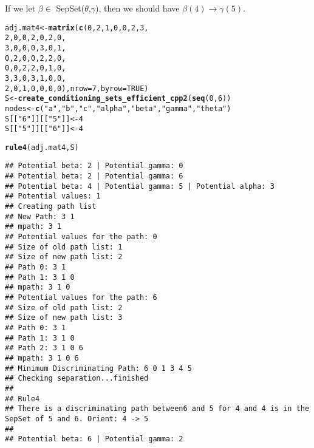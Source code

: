 \documentclass[12pt]{article}\usepackage[]{graphicx}\usepackage[]{color}
\makeatletter
\newcommand{\hlnum}[1]{\textcolor[rgb]{0.686,0.059,0.569}{#1}}%
\newcommand{\hlstr}[1]{\textcolor[rgb]{0.192,0.494,0.8}{#1}}%
\newcommand{\hlstd}[1]{\textcolor[rgb]{0.345,0.345,0.345}{#1}}%
\newcommand{\hlkwb}[1]{\textcolor[rgb]{0.69,0.353,0.396}{#1}}%
\newcommand{\hlkwc}[1]{\textcolor[rgb]{0.333,0.667,0.333}{#1}}%
\newcommand{\hlkwd}[1]{\textcolor[rgb]{0.737,0.353,0.396}{\textbf{#1}}}%
\newenvironment{kframe}{%
 \def\at@end@of@kframe{}%
 \ifinner\ifhmode%
  \def\at@end@of@kframe{\end{minipage}}%
  \begin{minipage}{\columnwidth}%
 \fi\fi%
 \def\FrameCommand##1{\hskip\@totalleftmargin \hskip-\fboxsep
 \colorbox{shadecolor}{##1}\hskip-\fboxsep
     \hskip-\linewidth \hskip-\@totalleftmargin \hskip\columnwidth}%
 \MakeFramed {\advance\hsize-\width
   \@totalleftmargin\z@ \linewidth\hsize
   \@setminipage}}%
 {\par\unskip\endMakeFramed%
 \at@end@of@kframe}
\newenvironment{knitrout}{}{} %
\makeatother
\begin{document}
If we let $\beta \in $ SepSet($\theta$,$\gamma$), then we should have $\beta (4) \rightarrow \gamma (5)$.
\begin{knitrout}
\color{fgcolor}\begin{kframe}
\begin{alltt}
\hlstd{adj.mat4} \hlkwb{<-} \hlkwd{matrix}\hlstd{(}\hlkwd{c}\hlstd{(}\hlnum{0}\hlstd{,}\hlnum{2}\hlstd{,}\hlnum{1}\hlstd{,}\hlnum{0}\hlstd{,}\hlnum{0}\hlstd{,}\hlnum{2}\hlstd{,}\hlnum{3}\hlstd{,}
                     \hlnum{2}\hlstd{,}\hlnum{0}\hlstd{,}\hlnum{0}\hlstd{,}\hlnum{2}\hlstd{,}\hlnum{0}\hlstd{,}\hlnum{2}\hlstd{,}\hlnum{0}\hlstd{,}
                     \hlnum{3}\hlstd{,}\hlnum{0}\hlstd{,}\hlnum{0}\hlstd{,}\hlnum{0}\hlstd{,}\hlnum{3}\hlstd{,}\hlnum{0}\hlstd{,}\hlnum{1}\hlstd{,}
                     \hlnum{0}\hlstd{,}\hlnum{2}\hlstd{,}\hlnum{0}\hlstd{,}\hlnum{0}\hlstd{,}\hlnum{2}\hlstd{,}\hlnum{2}\hlstd{,}\hlnum{0}\hlstd{,}
                     \hlnum{0}\hlstd{,}\hlnum{0}\hlstd{,}\hlnum{2}\hlstd{,}\hlnum{2}\hlstd{,}\hlnum{0}\hlstd{,}\hlnum{1}\hlstd{,}\hlnum{0}\hlstd{,}
                     \hlnum{3}\hlstd{,}\hlnum{3}\hlstd{,}\hlnum{0}\hlstd{,}\hlnum{3}\hlstd{,}\hlnum{1}\hlstd{,}\hlnum{0}\hlstd{,}\hlnum{0}\hlstd{,}
                     \hlnum{2}\hlstd{,}\hlnum{0}\hlstd{,}\hlnum{1}\hlstd{,}\hlnum{0}\hlstd{,}\hlnum{0}\hlstd{,}\hlnum{0}\hlstd{,}\hlnum{0}\hlstd{),}\hlkwc{nrow} \hlstd{=} \hlnum{7}\hlstd{,}\hlkwc{byrow} \hlstd{=} \hlnum{TRUE}\hlstd{)}
\hlstd{S} \hlkwb{<-} \hlkwd{create_conditioning_sets_efficient_cpp2}\hlstd{(}\hlkwd{seq}\hlstd{(}\hlnum{0}\hlstd{,}\hlnum{6}\hlstd{))}
\hlstd{nodes} \hlkwb{<-} \hlkwd{c}\hlstd{(}\hlstr{"a"}\hlstd{,}\hlstr{"b"}\hlstd{,}\hlstr{"c"}\hlstd{,}\hlstr{"alpha"}\hlstd{,}\hlstr{"beta"}\hlstd{,}\hlstr{"gamma"}\hlstd{,}\hlstr{"theta"}\hlstd{)}
\hlstd{S[[}\hlstr{"6"}\hlstd{]][[}\hlstr{"5"}\hlstd{]]} \hlkwb{<-} \hlnum{4}
\hlstd{S[[}\hlstr{"5"}\hlstd{]][[}\hlstr{"6"}\hlstd{]]} \hlkwb{<-} \hlnum{4}

\hlkwd{rule4}\hlstd{(adj.mat4,S)}
\end{alltt}
\begin{verbatim}
## Potential beta: 2 | Potential gamma: 0
## Potential beta: 2 | Potential gamma: 6
## Potential beta: 4 | Potential gamma: 5 | Potential alpha: 3
## Potential values: 1
## Creating path list
## New Path: 3 1
## mpath: 3 1
## Potential values for the path: 0
## Size of old path list: 1
## Size of new path list: 2
## Path 0: 3 1
## Path 1: 3 1 0
## mpath: 3 1 0
## Potential values for the path: 6
## Size of old path list: 2
## Size of new path list: 3
## Path 0: 3 1
## Path 1: 3 1 0
## Path 2: 3 1 0 6
## mpath: 3 1 0 6
## Minimum Discriminating Path: 6 0 1 3 4 5
## Checking separation...finished
## 
## Rule4
## There is a discriminating path between6 and 5 for 4 and 4 is in the SepSet of 5 and 6. Orient: 4 -> 5
## 
## Potential beta: 6 | Potential gamma: 2
\end{verbatim}
\end{kframe}
\end{knitrout}
\end{document}

